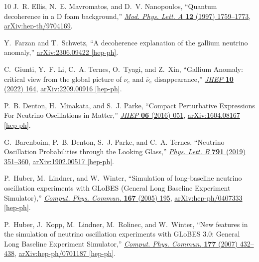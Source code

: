 \documentclass[aps, prd, onecolumn, tightenlines, notitlepage, superscriptaddress, nofootinbib, preprintnumbers, floatfix,showkeys,11pt]{revtex4-2}
\begin{document}
\begin{thebibliography}{10}
J.~R. Ellis, N.~E. Mavromatos, and D.~V. Nanopoulos, ``{Quantum decoherence in
  a D foam background},''
  \href{http://dx.doi.org/10.1142/S0217732397001795}{{\em Mod. Phys. Lett. A}
  {\bfseries 12} (1997) 1759--1773},
  \href{http://arxiv.org/abs/hep-th/9704169}{{\ttfamily arXiv:hep-th/9704169}}.

Y.~Farzan and T.~Schwetz, ``{A decoherence explanation of the gallium neutrino
  anomaly},'' \href{http://arxiv.org/abs/2306.09422}{{\ttfamily
  arXiv:2306.09422 [hep-ph]}}.

C.~Giunti, Y.~F. Li, C.~A. Ternes, O.~Tyagi, and Z.~Xin, ``{Gallium Anomaly:
  critical view from the global picture of \ensuremath{\nu}$_{e}$ and $
  {\overline{\nu}}_e $ disappearance},''
  \href{http://dx.doi.org/10.1007/JHEP10(2022)164}{{\em JHEP} {\bfseries 10}
  (2022) 164}, \href{http://arxiv.org/abs/2209.00916}{{\ttfamily
  arXiv:2209.00916 [hep-ph]}}.

P.~B. Denton, H.~Minakata, and S.~J. Parke, ``{Compact Perturbative Expressions
  For Neutrino Oscillations in Matter},''
  \href{http://dx.doi.org/10.1007/JHEP06(2016)051}{{\em JHEP} {\bfseries 06}
  (2016) 051}, \href{http://arxiv.org/abs/1604.08167}{{\ttfamily
  arXiv:1604.08167 [hep-ph]}}.

G.~Barenboim, P.~B. Denton, S.~J. Parke, and C.~A. Ternes, ``{Neutrino
  Oscillation Probabilities through the Looking Glass},''
  \href{http://dx.doi.org/10.1016/j.physletb.2019.03.002}{{\em Phys. Lett. B}
  {\bfseries 791} (2019) 351--360},
  \href{http://arxiv.org/abs/1902.00517}{{\ttfamily arXiv:1902.00517
  [hep-ph]}}.

P.~Huber, M.~Lindner, and W.~Winter, ``{Simulation of long-baseline neutrino
  oscillation experiments with GLoBES (General Long Baseline Experiment
  Simulator)},'' \href{http://dx.doi.org/10.1016/j.cpc.2005.01.003}{{\em
  Comput. Phys. Commun.} {\bfseries 167} (2005) 195},
\href{http://arxiv.org/abs/hep-ph/0407333}{{\ttfamily arXiv:hep-ph/0407333
  [hep-ph]}}.

P.~Huber, J.~Kopp, M.~Lindner, M.~Rolinec, and W.~Winter, ``{New features in
  the simulation of neutrino oscillation experiments with GLoBES 3.0: General
  Long Baseline Experiment Simulator},''
  \href{http://dx.doi.org/10.1016/j.cpc.2007.05.004}{{\em Comput. Phys.
  Commun.} {\bfseries 177} (2007) 432--438},
\href{http://arxiv.org/abs/hep-ph/0701187}{{\ttfamily arXiv:hep-ph/0701187
  [hep-ph]}}.


\end{thebibliography}
\end{document}
